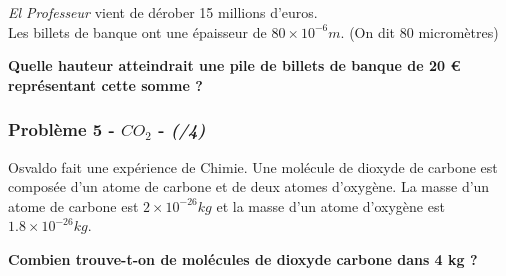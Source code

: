 \textit{\og El Professeur \fg{} } vient de dérober 15 millions d’euros. \\
Les billets de banque ont une épaisseur de $80 \times 10^{-6} m$. (On dit 80 micromètres)

\textbf{Quelle hauteur atteindrait une pile de billets de banque de 20 \euro{} représentant cette somme ?}

\Pointilles[5]

\subsubsection*{Problème 5 - $CO_2$  - \textit{(/4)}}

Osvaldo fait une expérience de Chimie. Une molécule de dioxyde de carbone est composée d'un atome de carbone et de deux atomes d'oxygène. La masse d'un atome de carbone est $2 \times 10^{-26}kg$ et la masse d'un atome d'oxygène est $1.8 \times 10^{-26}kg$. 

\textbf{Combien trouve-t-on de molécules de dioxyde carbone dans 4 kg ?}

\Pointilles[5]

